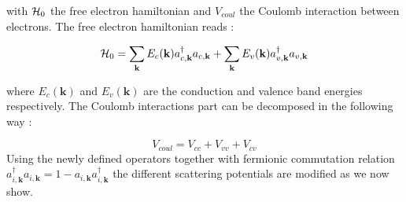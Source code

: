\noindent with $\mathcal{H}_0$ the free electron hamiltonian and $V_{coul}$ the Coulomb interaction between electrons. The free electron hamiltonian reads :

\begin{equation}
    \mathcal{H}_0 = \sum_{\mathbf{k}} E_c(\mathbf{k}) a^{\dagger}_{c,\mathbf{k}}a_{c,\mathbf{k}}+\sum_{\mathbf{k}} E_v(\mathbf{k}) a^{\dagger}_{v,\mathbf{k}}a_{v,\mathbf{k}}
    \label{eq:free_electron_hamiltonian}
\end{equation}

\noindent where $E_c(\mathbf{k})$ and $E_v(\mathbf{k})$ are the conduction and valence band energies respectively. The Coulomb interactions part can be decomposed in the following way :

\begin{equation}
    V_{coul} = V_{cc} + V_{vv} + V_{cv}
    \label{eq:coulomb_interaction}
\end{equation}
Using the newly defined operators together with fermionic commutation relation $a^{\dagger}_{i,\textbf{k}}a_{i,\textbf{k}}= 1-a_{i,\textbf{k}}a^{\dagger}_{i,\textbf{k}}  $ the different scattering potentials are modified as we now show. 

